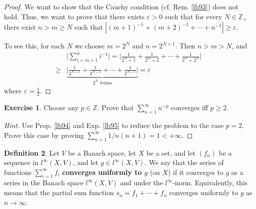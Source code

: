\documentclass[12pt,b5paper,notitlepage]{article}
\theoremstyle{definition}
\newtheorem{df}{Definition}[section]
\newtheorem{exe}[df]{Exercise}
\newtheorem{rem}[df]{Remark}
\theoremstyle{plain}
\newcommand{\Zbb}{\mathbb Z}
\newcommand{\Rbb}{\mathbb R}
\newcommand{\dps}{\displaystyle}
\newcommand{\eps}{\varepsilon}
\numberwithin{equation}{section}
\begin{document}
\begin{proof}
We want to show that the Cauchy condition (cf. Rem. \ref{lb93}) does not hold. Thus, we want to prove that there exists $\eps>0$ such that for every $N\in\Zbb_+$ there exist $n>m\geq N$ such that $|(m+1)^{-1}+(m+2)^{-1}+\cdots+n^{-1}|\geq\eps$.

To see this, for each $N$ we choose  $m=2^N$ and $n=2^{N+1}$. Then $n>m>N$, and
\begin{align*}
&\Big|\sum_{i=m+1}^n i^{-1}\Big|=\Big|\frac 1{2^N+1}+\frac 1{2^N+2}+\cdots +\frac 1{2^N+2^N}  \Big|\\
\geq&\underbrace{\Big|\frac 1{2^{N+1}}+\frac 1{2^{N+1}}+\cdots +\frac 1{2^{N+1}}  \Big|}_{2^N\text{ terms}}=\eps
\end{align*}
where $\eps=\frac 12$.
\end{proof}

\begin{comment}
\begin{rem}
For every $p\in\Rbb$, assume that $n^p$ (where $n\in\Zbb_+$) is defined and that the properties we learned in high school mathematics are satisfied. If $p\leq 1$, then clearly $\sum_{n=1}^\infty n^{-p}=+\infty$ since $1/n^p\geq 1/n$. It is in fact true that for every $p>1$ we have $\sum_{n=1}^\infty n^{-p}<+\infty$. The easiest (but not the most elementary) way to see this is by using integrals: This series equals $1+\int_{x=1}^{+\infty}f(x)dx$ where $f:[1,+\infty)\rightarrow\Rbb_{\geq0}$ equals $(n+1)^{-p}$ when restricted to $[n,n+1)$. So $f(x)\leq x^{-p}$ on $[1,+\infty)$. Hence $\int_{x=1}^{+\infty}f(x)dx\leq \int_{x=1}^{+\infty}x^{-p}dx=(1-p)^{-1}x^{1-p}|_{x=1}^{+\infty}=(p-1)^{-1}<+\infty$.
\end{rem}
\end{comment}


\begin{exe}\label{lb96}
Choose any $p\in\Zbb$. Prove that $\dps\sum_{n=1}^\infty n^{-p}$ converges iff $p\geq 2$.
\end{exe}

\begin{proof}[Hint]
Use Prop. \ref{lb94} and Exp. \ref{lb95} to reduce the problem to the case $p=2$. Prove this case by proving $\sum_{n=1}^\infty 1/n(n+1)=1<+\infty$.
\end{proof}



\begin{df}
Let $V$ be a Banach space, let $X$ be a set, and let $(f_n)$ be a sequence in $l^\infty(X,V)$, and let $g\in l^\infty(X,V)$. We say that the series of functions $\dps\sum_{i=1}^\infty f_i$ \textbf{converges uniformly to $g$}  (on $X$) if it converges to $g$ as a series in the Banach space $l^\infty(X,V)$ and under the $l^\infty$-norm. Equivalently, this means that the partial sum function $s_n=f_1+\cdots+f_n$ converges uniformly to $g$ as $n\rightarrow\infty$.
\end{df}
\end{document}
